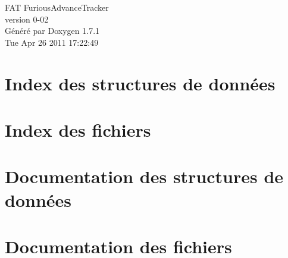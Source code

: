 \documentclass[a4paper]{book}
\begin{document}
\hypersetup{pageanchor=false}
\begin{titlepage}
\vspace*{7cm}
\begin{center}
{\Large FAT FuriousAdvanceTracker \\[1ex]\large version 0-\/02 }\\
\vspace*{1cm}
{\large Généré par Doxygen 1.7.1}\\
\vspace*{0.5cm}
{\small Tue Apr 26 2011 17:22:49}\\
\end{center}
\end{titlepage}
\clearemptydoublepage
{}
\tableofcontents
\clearemptydoublepage
{}
\hypersetup{pageanchor=true}
\chapter{Index des structures de données}

\chapter{Index des fichiers}

\chapter{Documentation des structures de données}









\chapter{Documentation des fichiers}




\printindex
\end{document}
